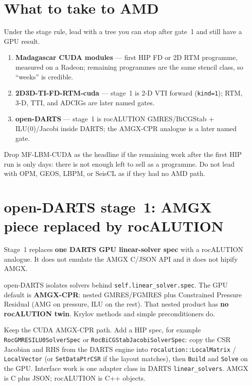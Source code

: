 \documentclass[11pt,a4paper]{article}
\begin{document}
\section{What to take to AMD}

Under the stage rule, lead with a tree you can stop after gate~1 and still have a GPU result.

\begin{enumerate}
\item \textbf{Madagascar CUDA modules} --- first HIP FD or 2D RTM programme, measured on a Radeon;
remaining programmes are the same stencil class, so ``weeks'' is credible.
\item \textbf{2D3D-TI-FD-RTM-cuda} --- stage~1 is 2-D VTI forward (\texttt{kind=1});
RTM, 3-D, TTI, and ADCIGs are later named gates.
\item \textbf{open-DARTS} --- stage~1 is rocALUTION GMRES/BiCGStab + ILU(0)/Jacobi
inside DARTS; the AMGX-CPR analogue is a later named gate.
\end{enumerate}

Drop MF-LBM-CUDA as the headline if the remaining work after the first HIP run is only days:
there is not enough left to sell as a programme.
Do not lead with OPM, GEOS, LBPM, or SeisCL as if they had no AMD path.

\section{open-DARTS stage~1: AMGX piece replaced by rocALUTION}

Stage~1 replaces \textbf{one DARTS GPU linear-solver spec} with a rocALUTION analogue.
It does not emulate the AMGX C/JSON API and it does not hipify AMGX.

open-DARTS isolates solvers behind \texttt{self.linear\_solver.spec}.
The GPU default is \textbf{AMGX-CPR}: nested GMRES/FGMRES plus Constrained Pressure Residual
(AMG on pressure, ILU on the rest).
That nested product has \textbf{no rocALUTION twin}.
Krylov methods and simple preconditioners do.

Keep the CUDA AMGX-CPR path. Add a HIP spec, for example
\texttt{RocGMRESILU0SolverSpec} or \texttt{RocBiCGStabJacobiSolverSpec}:
copy the CSR Jacobian and RHS from the DARTS engine into
\texttt{rocalution::LocalMatrix} / \texttt{LocalVector}
(or \texttt{SetDataPtrCSR} if the layout matches), then \texttt{Build} and \texttt{Solve} on the GPU.
Interface work is one adapter class in DARTS \texttt{linear\_solvers}.
AMGX is C plus JSON; rocALUTION is C++ objects.
\end{document}
